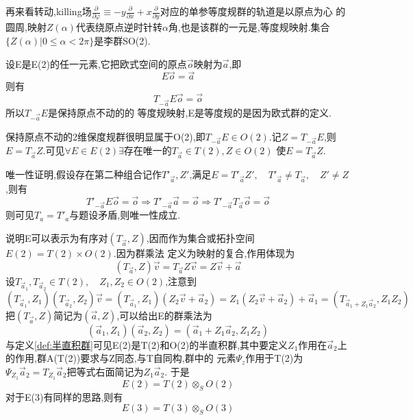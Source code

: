 \documentclass[../main.tex]{subfiles}
\begin{document}
 再来看转动,killing场$\frac{\partial}{\partial \varphi} \equiv - y\frac{\partial}{\partial x} + x\frac{\partial}{\partial y}$对应的单参等度规群的轨道是以原点为心
 的圆周,映射$Z(\alpha)$代表绕原点逆时针转$\alpha$角,也是该群的一元是,等度规映射.集合$\{Z(\alpha)|0\le \alpha < 2\pi\}$是李群SO(2).

 设E是E(2)的任一元素,它把欧式空间的原点$\vec{o}$映射为$\vec{a}$,即$$E\vec{o} = \vec{a}$$则有$$T_{-\vec{a}}E\vec{o} = \vec{o}$$所以$T_{-\vec{a}}E$是保持原点不动的的
 等度规映射,E是等度规的是因为欧式群的定义.

 保持原点不动的2维保度规群很明显属于O(2),即$T_{-\vec{a}}E \in O(2)$.记$Z = T_{-\vec{a}}E$,则$E = T_{\vec{a}}Z$.可见$\forall E \in E(2)\exists$存在唯一的$T_{\vec{a}}\in T(2),Z\in O(2)$
 使$E = T_{\vec{a}}Z$.

 唯一性证明,假设存在第二种组合记作$T'_{\vec{a}},Z'$,满足$E = T'_{\vec{a}}Z',\quad T'_{\vec{a}}\ne T_{\vec{a}},\quad Z'\ne Z$,则有
 \begin{equation*}
     T'_{-\vec{a}} E \vec{o} = \vec{o} \Rightarrow
     T'_{-\vec{a}} \vec{a} = \vec{o} \Rightarrow
     T'_{-\vec{a}}T_{\vec{a}}\vec{o} = \vec{o}
 \end{equation*}
 则可见$T_{a} = T'_{a}$与题设矛盾,则唯一性成立.

 说明E可以表示为有序对$(T_{\vec{a}},Z)$,因而作为集合或拓扑空间$E(2) = T(2)\times O(2)$.因为群乘法
 定义为映射的复合,作用体现为
 $$(T_{\vec{a}},Z)\vec{v} = T_{\vec{a}}Z\vec{v} = Z\vec{v} +\vec{a}$$
 设$T_{\vec{a}_1},T_{\vec{a}_2} \in T(2),\quad Z_1,Z_2 \in O(2)$,注意到
 $$(T_{\vec{a}_1},Z_1)(T_{\vec{a}_2},Z_2)\vec{v} = (T_{\vec{a}_1},Z_1)(Z_2\vec{v} + \vec{a}_2) = Z_1(Z_2\vec{v} + \vec{a}_2) + \vec{a}_1 = (T_{\vec{a}_1 + Z_1\vec{a}_2},Z_1Z_2)$$
 把$(T_{\vec{a}},Z)$简记为$(\vec{a},Z)$,可以给出E的群乘法为
 $$(\vec{a}_1,Z_1)(\vec{a}_2,Z_2) = (\vec{a}_1 + Z_1\vec{a}_2,Z_1Z_2)$$
 与定义\ref{def:半直积群}可见E(2)是T(2)和O(2)的半直积群,其中要定义$Z_1$作用在$\vec{a}_2$上的作用,群A(T(2))要求与Z同态,与T自同构,群中的
 元素$\Psi_z$作用于T(2)为$\Psi_{Z_1}\vec{a}_2 = T_{Z_1}\vec{a}_2$把等式右面简记为$Z_1\vec{a}_2$.
 于是$$E(2) = T(2) \otimes_S O(2)$$
 对于E(3)有同样的思路,则有$$E(3) = T(3) \otimes_S O(3)$$
\end{document}
